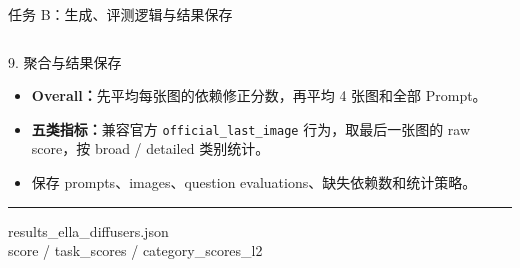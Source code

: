\documentclass[aspectratio=169,10pt]{beamer}
\begin{document}
\begin{frame}{任务 B：生成、评测逻辑与结果保存}
\begin{columns}[T,onlytextwidth]
      \begin{block}{9. 聚合与结果保存}
        \begin{minipage}[c][5.05cm][c]{\linewidth}
          \begin{itemize}\scriptsize
            \item \textbf{Overall：}先平均每张图的依赖修正分数，再平均 4 张图和全部 Prompt。
            \item \textbf{五类指标：}兼容官方 \texttt{official\_last\_image} 行为，取最后一张图的 raw score，按 broad / detailed 类别统计。
            \item 保存 prompts、images、question evaluations、缺失依赖数和统计策略。
          \end{itemize}
          \vspace{0.45em}
          \color{T2IGray}\rule{\linewidth}{0.35pt}\par\vspace{0.3em}
          \scriptsize\ttfamily
          results\_ella\_diffusers.json\\
          score / task\_scores / category\_scores\_l2
        \end{minipage}
      \end{block}
  \end{columns}
\end{frame}
\end{document}
